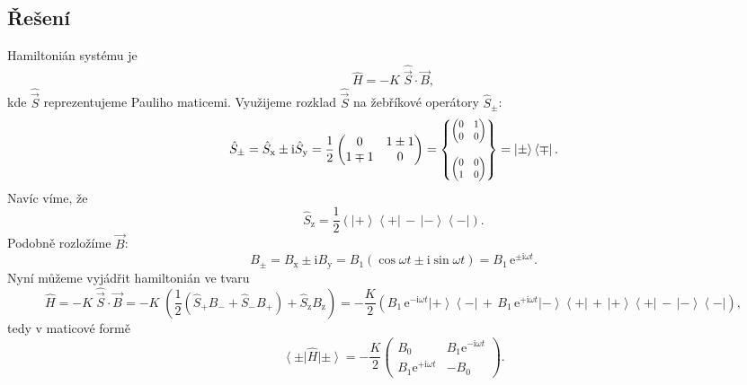 \documentclass[10pt,a4paper]{article}
\newcommand{\const}[1]{\text{#1}}
\newcommand{\mat}[1]{
    \begin{pmatrix}
        #1
    \end{pmatrix}
}
\newcommand{\smat}[2][1]{
    \scalebox{#1}{$\mat{#2}$}
}
\newcommand{\bra}[1]{\left< #1 \right|}
\newcommand{\ket}[1]{\left| #1 \right>}
\newcommand{\e}[1]{\const{e}^{#1}}
\renewcommand{\i}{\const{i}}
\begin{document}
\subsection{Řešení}
Hamiltonián systému je
\begin{equation*}
    \hat H = - K \; \hat{\vec S} \cdot \vec B,
\end{equation*}
kde $\hat{\vec S}$ reprezentujeme Pauliho maticemi. Využijeme rozklad $\hat{\vec S}$ na žebříkové operátory $\hat S_\pm$:
\begin{equation*}
    \hat S_\pm
    = \hat S_\mathrm{x} \pm \i \hat S_\mathrm{y}
    = \frac{1}{2} \mat{ 0 & 1 \pm 1 \\ 1 \mp 1 & 0 }
    = \begin{Bmatrix}
        \smat[0.8]{0 & 1 \\ 0 & 0} \\[15pt]
        \smat[0.8]{0 & 0 \\ 1 & 0}
    \end{Bmatrix}
    = \ket{\pm} \bra{\mp}.
\end{equation*}
Navíc víme, že
\begin{equation*}
    \hat S_\mathrm{z}
    = \frac{1}{2} (\ket{+} \! \bra{+} \, - \, \ket{-} \! \bra{-}).
\end{equation*}
Podobně rozložíme $\vec B$:
\begin{equation*}
    B_\pm
    = B_\mathrm{x} \pm \i B_\mathrm{y}
    = B_1 (\cos \omega t \pm \i \sin \omega t)
    = B_1 \, \e{\pm \i \omega t}.
\end{equation*}
Nyní můžeme vyjádřit hamiltonián ve tvaru
\begin{equation*}
    \hat H
    = -K \; \hat{\vec S} \cdot \vec B
    = -K \; \left(
        \frac{1}{2} (\hat S_+ B_- + \hat S_- B_+)
        + \hat S_\mathrm{z} B_\mathrm{z}
    \right)
    = -\frac{K}{2} \left(
        B_1 \, \e{-\i \omega t} \ket{+} \! \bra{-} \, + \,
        B_1 \, \e{+\i \omega t} \ket{-} \! \bra{+} \, + \,
        \ket{+} \! \bra{+} \, - \, \ket{-} \! \bra{-}
    \right),
\end{equation*}
tedy v maticové formě
\begin{equation*}
    \bra{\pm} \hat H \ket{\pm} =
    -\frac{K}{2} \mat{
        B_0 & B_1 \e{-\i \omega t}  \\
        B_1 \e{+\i \omega t} & -B_0
    }.
\end{equation*}

\bigskip
\end{document}
